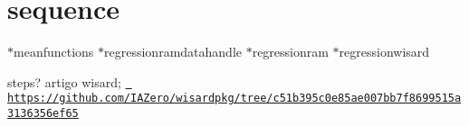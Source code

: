\chapter{sequence}
\hypertarget{md_src_2models_2regressionwisard_2sequence}{}\label{md_src_2models_2regressionwisard_2sequence}
\texorpdfstring{$\ast$}{*}meanfunctions \texorpdfstring{$\ast$}{*}regressionramdatahandle \texorpdfstring{$\ast$}{*}regressionram \texorpdfstring{$\ast$}{*}regressionwisard

steps? artigo wisard; \href{https://github.com/IAZero/wisardpkg/tree/c51b395c0e85ae007bb7f8699515a3136356ef65}{\texttt{ https\+://github.\+com/\+IAZero/wisardpkg/tree/c51b395c0e85ae007bb7f8699515a3136356ef65}} 